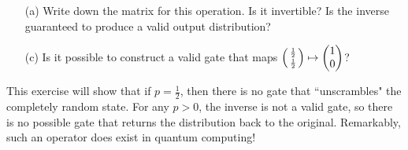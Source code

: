 \documentclass{article}
\begin{document}
\begin{itemize}
    \item[(a)] Write down the matrix for this operation. Is it invertible? Is the inverse guaranteed to produce a valid output distribution?
    \item[(c)] Is it possible to construct a valid gate that maps $\smqty(\frac{1}{2} \\ \frac{1}{2}) \mapsto \mqty(1 \\ 0)$?
\end{itemize}

This exercise will show that if $p = \frac{1}{2}$, then there is no gate that ``unscrambles" the completely random state. For any $p > 0$, the inverse is not a valid gate, so there is no possible gate that returns the distribution back to the original. Remarkably, such an operator does exist in quantum computing!
\end{document}
